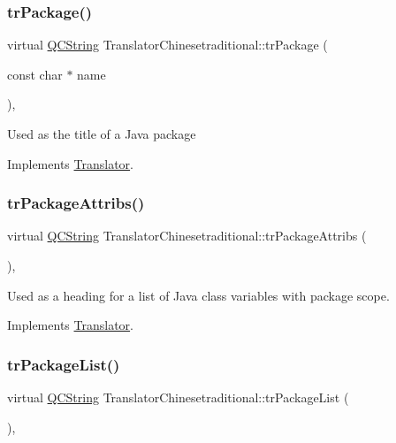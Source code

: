 \subsubsection{\texorpdfstring{trPackage()}{trPackage()}}
{\footnotesize\ttfamily virtual \mbox{\hyperlink{class_q_c_string}{Q\+C\+String}} Translator\+Chinesetraditional\+::tr\+Package (\begin{DoxyParamCaption}\item[{const char $\ast$}]{name }\end{DoxyParamCaption})\hspace{0.3cm}{\ttfamily [inline]}, {\ttfamily [virtual]}}

Used as the title of a Java package 

Implements \mbox{\hyperlink{class_translator}{Translator}}.

\mbox{\label{class_translator_chinesetraditional_a3df74e7c393faf110b039fd8c52df59c}} 
\subsubsection{\texorpdfstring{trPackageAttribs()}{trPackageAttribs()}}
{\footnotesize\ttfamily virtual \mbox{\hyperlink{class_q_c_string}{Q\+C\+String}} Translator\+Chinesetraditional\+::tr\+Package\+Attribs (\begin{DoxyParamCaption}{ }\end{DoxyParamCaption})\hspace{0.3cm}{\ttfamily [inline]}, {\ttfamily [virtual]}}

Used as a heading for a list of Java class variables with package scope. 

Implements \mbox{\hyperlink{class_translator}{Translator}}.

\mbox{\label{class_translator_chinesetraditional_a0f012231cca065aadb4c58ed4615a1a3}} 
\subsubsection{\texorpdfstring{trPackageList()}{trPackageList()}}
{\footnotesize\ttfamily virtual \mbox{\hyperlink{class_q_c_string}{Q\+C\+String}} Translator\+Chinesetraditional\+::tr\+Package\+List (\begin{DoxyParamCaption}{ }\end{DoxyParamCaption})\hspace{0.3cm}{\ttfamily [inline]}, {\ttfamily [virtual]}}

